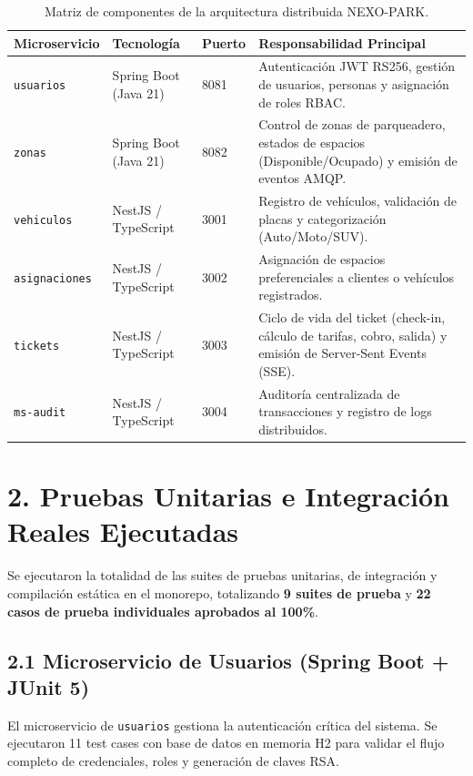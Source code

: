 \documentclass[11pt,a4paper]{article}
\begin{document}
\begin{table}[h!]
\centering
\small
\begin{tabularx}{\textwidth}{l l l X}
\toprule
\textbf{Microservicio} & \textbf{Tecnología} & \textbf{Puerto} & \textbf{Responsabilidad Principal} \\
\midrule
\texttt{usuarios} & Spring Boot (Java 21) & 8081 & Autenticación JWT RS256, gestión de usuarios, personas y asignación de roles RBAC. \\
\texttt{zonas} & Spring Boot (Java 21) & 8082 & Control de zonas de parqueadero, estados de espacios (Disponible/Ocupado) y emisión de eventos AMQP. \\
\texttt{vehiculos} & NestJS / TypeScript & 3001 & Registro de vehículos, validación de placas y categorización (Auto/Moto/SUV). \\
\texttt{asignaciones} & NestJS / TypeScript & 3002 & Asignación de espacios preferenciales a clientes o vehículos registrados. \\
\texttt{tickets} & NestJS / TypeScript & 3003 & Ciclo de vida del ticket (check-in, cálculo de tarifas, cobro, salida) y emisión de Server-Sent Events (SSE). \\
\texttt{ms-audit} & NestJS / TypeScript & 3004 & Auditoría centralizada de transacciones y registro de logs distribuidos. \\
\bottomrule
\end{tabularx}
\caption{Matriz de componentes de la arquitectura distribuida NEXO-PARK.}
\end{table}

\section{2. Pruebas Unitarias e Integración Reales Ejecutadas}
Se ejecutaron la totalidad de las suites de pruebas unitarias, de integración y compilación estática en el monorepo, totalizando \textbf{9 suites de prueba} y \textbf{22 casos de prueba individuales aprobados al 100\%}.

\subsection{2.1 Microservicio de Usuarios (Spring Boot + JUnit 5)}
El microservicio de \texttt{usuarios} gestiona la autenticación crítica del sistema. Se ejecutaron 11 test cases con base de datos en memoria H2 para validar el flujo completo de credenciales, roles y generación de claves RSA.
\end{document}
